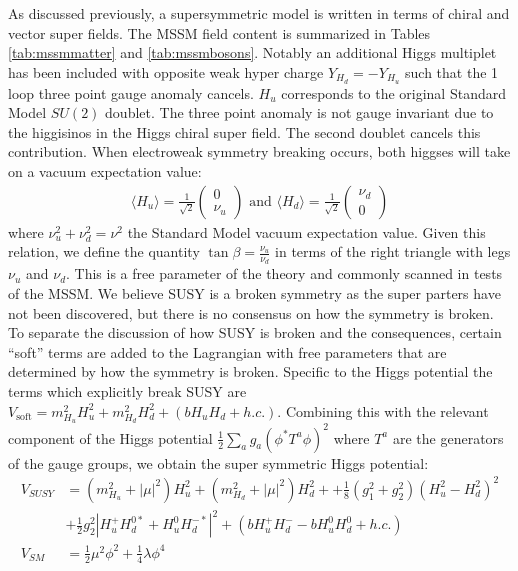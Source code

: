 As discussed previously, a supersymmetric model is written in terms of chiral and vector super fields. 
The MSSM field content is summarized in Tables \ref{tab:mssmmatter} and \ref{tab:mssmbosons}. Notably
an additional Higgs multiplet has been included with opposite weak hyper charge $Y_{H_d}=-Y_{H_u}$ such that
the 1 loop three point gauge anomaly cancels. $H_u$ corresponds to the original Standard Model $SU(2)$ doublet. 
The three point anomaly is not gauge invariant due to the higgisinos in the Higgs chiral super field.
 The second doublet cancels this contribution. When electroweak symmetry breaking occurs, both
 higgses will take on a vacuum expectation value:
\begin{align*}
\langle H_u \rangle = \frac{1}{\sqrt{2}} \begin{pmatrix} 0  \\ \nu_u  \end{pmatrix} \text{ and } 
\langle H_d \rangle = \frac{1}{\sqrt{2}} \begin{pmatrix} \nu_d \\ 0  \end{pmatrix}
\end{align*}
where $\nu_u^2 + \nu_d^2 = \nu^2$ the Standard Model vacuum expectation value. Given this relation, we define the 
quantity $\tan{\beta} = \frac{\nu_u}{\nu_d}$ in terms of the right triangle with legs $\nu_u$ and $\nu_d$.
This is a free parameter of the theory and commonly scanned in tests of the MSSM. We believe
SUSY is a broken symmetry as the super parters have not been discovered, but there is no consensus
on how the symmetry is broken. To separate the discussion of how SUSY is broken and the consequences, 
certain ``soft'' terms are added to the Lagrangian with free parameters that are determined by how
the symmetry is broken. Specific to the Higgs potential the terms which explicitly break SUSY are
 $V_{\text{soft}} = m_{H_u}^2 H_u^2 + m_{H_d}^2 H_d^2 + (bH_uH_d  + h.c.)$. Combining this with the relevant
component of the Higgs potential  $\frac{1}{2} \sum_a g_a (\phi^*T^a\phi)^2$ where $T^a$ are the generators of the gauge
groups, we obtain the super symmetric Higgs potential:
\begin{align*}
V_{SUSY} &= (m_{H_u}^2 + |\mu|^2) H_u^2 + (m_{H_d}^2 + |\mu|^2) H_d^2 +  + \frac{1}{8}(g_1^2 + g_2^2)(H_u^2- H_d^2)^2 \\ 
&+ \frac{1}{2}g_2^2| H_u^+ H_d^{0*} + H_u^0H_d^{-*}|^2 + (b H_u^+H_d^- - bH_u^0 H_d^0 + h.c.) \\
V_{SM} &= \frac{1}{2}\mu^2 \phi^2 + \frac{1}{4}\lambda \phi^4
\end{align*}
